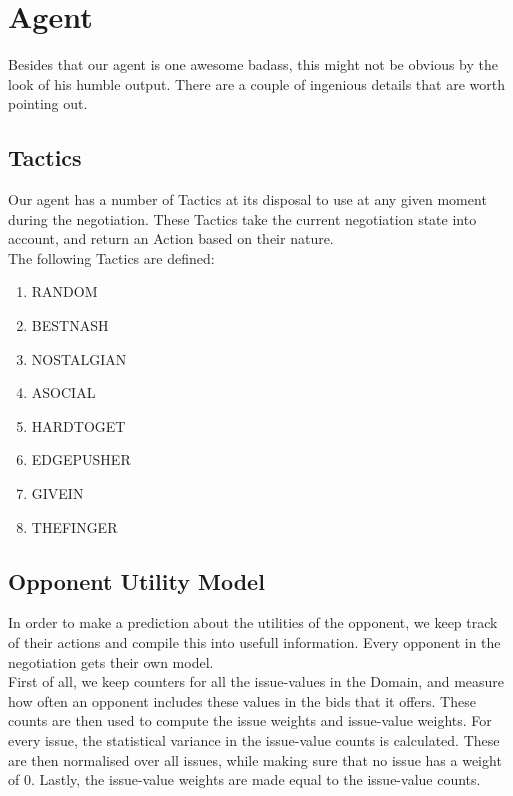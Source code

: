 \section{Agent}
Besides that our agent is one awesome badass, this might not be obvious by the look of his humble output. There are a couple of ingenious details that are worth pointing out.

\subsection{Tactics}
Our agent has a number of Tactics at its disposal to use at any given moment during the negotiation. These Tactics take the current negotiation state into account, and return an Action based on their nature. \\

\noindent The following Tactics are defined:
\begin{enumerate}
\item RANDOM
\item BESTNASH
\item NOSTALGIAN
\item ASOCIAL
\item HARDTOGET
\item EDGEPUSHER
\item GIVEIN
\item THEFINGER
\end{enumerate}

\subsection{Opponent Utility Model}
\label{sec:opponentutilitymodel}
In order to make a prediction about the utilities of the opponent, we keep track of their actions and compile this into usefull information. Every opponent in the negotiation gets their own model.\\

First of all, we keep counters for all the issue-values in the Domain, and measure how often an opponent includes these values in the bids that it offers. These counts are then used to compute the issue weights and issue-value weights. For every issue, the statistical variance in the issue-value counts is calculated. These are then normalised over all issues, while making sure that no issue has a weight of 0. Lastly, the issue-value weights are made equal to the issue-value counts.

